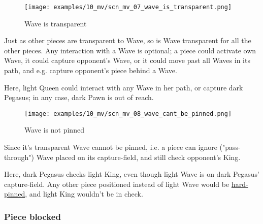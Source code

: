 \vspace*{-1.4\baselineskip}
\noindent
\begin{figure}[!h]
\texttt{[image: examples/10\_mv/scn\_mv\_07\_wave\_is\_transparent.png]}
\vspace*{-1.3\baselineskip}
\caption{Wave is transparent}
\label{fig:scn_mv_07_wave_is_transparent}
\end{figure}

\vspace*{-0.4\baselineskip}
Just as other pieces are transparent to Wave, so is Wave transparent for all the
other pieces. Any interaction with a Wave is optional; a piece could activate own
Wave, it could capture opponent's Wave, or it could move past all Waves in its path,
and e.g. capture opponent's piece behind a Wave.

\noindent
Here, light Queen could interact with any Wave in her path, or capture dark Pegasus;
in any case, dark Pawn is out of reach.

\clearpage %

\vspace*{-2.1\baselineskip}
\noindent
\begin{figure}[!h]
\texttt{[image: examples/10\_mv/scn\_mv\_08\_wave\_cant\_be\_pinned.png]}
\vspace*{-1.3\baselineskip}
\caption{Wave is not pinned}
\label{fig:scn_mv_08_wave_cant_be_pinned}
\end{figure}

\vspace*{-0.5\baselineskip}
Since it's transparent Wave cannot be pinned, i.e. a piece can ignore ("pass-through")
Wave placed on its capture-field, and still check opponent's King.

Here, dark Pegasus checks light King, even though light Wave is on dark Pegasus'
capture-field. Any other piece positioned instead of light Wave would be
\href{https://en.wikipedia.org/wiki/Pin_(chess)#Absolute_pin}{hard-pinned},
and light King wouldn't be in check.

\clearpage %

\subsubsection*{Piece blocked}
\label{sec:Miranda's veil/Wave/Activation/Piece blocked}


